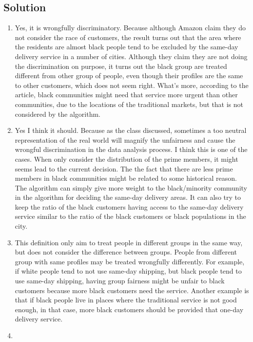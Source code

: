 \documentclass[submit]{harvardml}
\begin{document}
\subsection*{Solution}
\begin{enumerate}
    \item 
    Yes, it is wrongfully discriminatory. Because although Amazon claim they do not consider the race of customers, the result turns out that the area where the residents are almost black people tend to be excluded by the same-day delivery service in a number of cities. Although they claim they are not doing the discrimination on purpose, it turns out the black group are treated different from other group of people, even though their profiles are the same to other customers, which does not seem right.  What's more, according to the article, black communities might need that service more urgent than other communities, due to the locations of the traditional markets, but that is not considered by the algorithm.
    \item
    Yes I think it should. Because as the class discussed, sometimes a too neutral representation of the real world will magnify the unfairness and cause the wrongful discrimination in the data analysis process. I think this is one of the cases. When only consider the distribution of the prime members, it might seems lead to the current decision. The the fact that there are less prime members in black communities might be related to some historical reason. The algorithm can simply give more weight to the black/minority community in the algorithm for deciding the same-day delivery areas. It can also try to keep the ratio of the black customers having access to the same-day delivery service similar to the ratio of the black customers or black populations in the city.
    \item
    This definition only aim to treat people in different groups in the same way, but does not consider the difference between groups. People from different group with same profiles may be treated wrongfully differently.  For example, if white people tend to not use same-day shipping, but black people tend to use same-day shipping, having group fairness might be unfair to black customers because more black customers need the service. Another example is that if black people live in places where the traditional service is not good enough, in that case, more black customers should be provided that one-day delivery service.
    \item

\end{enumerate}
\end{document}
